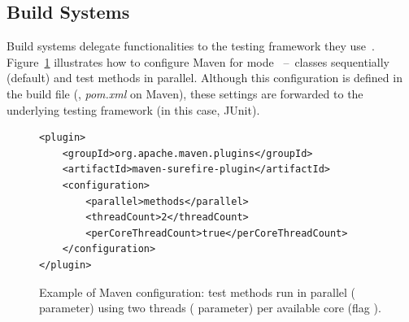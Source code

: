 

\subsection{Build Systems}

Build systems delegate functionalities to the testing framework they
use~\cite{maven-surefire-plugin}.  Figure~\ref{fig:surefire}
illustrates how to configure Maven for mode
\ParClassSeqMeth{}~--~classes sequentially (default) and test methods
in parallel. Although this configuration is defined in the build file
(\eg, \emph{pom.xml} on Maven), these settings are forwarded to the
underlying testing framework (in this case, JUnit).


\begin{figure}[h!]
\centering
\scriptsize
{}
\begin{lstlisting}
<plugin>
    <groupId>org.apache.maven.plugins</groupId>
    <artifactId>maven-surefire-plugin</artifactId>
    <configuration>
        <parallel>methods</parallel>
        <threadCount>2</threadCount>
        <perCoreThreadCount>true</perCoreThreadCount>
    </configuration>
</plugin>
\end{lstlisting}
\caption{\label{fig:surefire} Example of Maven configuration: test
  methods run in parallel ( parameter) using two
  threads ( parameter) per available core (flag
  ).}
\end{figure}

